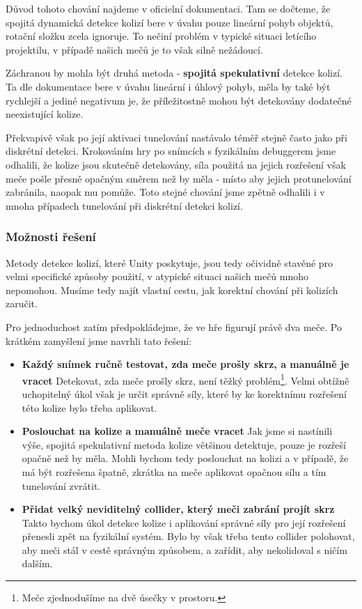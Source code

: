 Důvod tohoto chování najdeme v oficielní dokumentaci. Tam se dočteme, že spojitá dynamická detekce kolizí bere v úvahu pouze lineární pohyb objektů, rotační složku zcela ignoruje. To nečiní problém v typické situaci letícího projektilu, v případě našich mečů je to však silně nežádoucí.  

\bigbreak

Záchranou by mohla být druhá metoda - \textbf{spojitá spekulativní} detekce kolizí. Ta dle dokumentace bere v úvahu lineární i úhlový pohyb, měla by také být rychlejší a jediné negativum je, že příležitostně mohou být detekovány dodatečné neexistující kolize. 

Překvapivě však po její aktivaci tunelování nastávalo téměř stejně často jako při diskrétní detekci. Krokováním hry po snímcích s fyzikálním debuggerem jsme odhalili, že kolize jsou skutečně detekovány, síla použitá na jejich rozřešení však meče pošle přesně opačným směrem než by měla - místo aby jejich protunelování zabránila, naopak mu pomůže. Toto stejné chování jsme zpětně odhalili i v mnoha případech tunelování při diskrétní detekci kolizí.


\subsubsection*{Možnosti řešení}

Metody detekce kolizí, které Unity poskytuje, jsou tedy očividně stavěné pro velmi specifické způsoby použití, v atypické situaci našich mečů mnoho nepomohou. Musíme tedy najít vlastní cestu, jak korektní chování při kolizích zaručit. 

Pro jednoduchost zatím předpokládejme, že ve hře figurují právě dva meče. Po krátkém zamyšlení jsme navrhli tato řešení:
\begin{itemize}
  \item \textbf{Každý snímek ručně testovat, zda meče prošly skrz, a manuálně je vracet}\linebreak
    Detekovat, zda meče prošly skrz, není těžký problém\footnote{Meče zjednodušíme na dvě úsečky v prostoru.}. Velmi obtížně uchopitelný úkol však je určit správně síly, které by ke korektnímu rozřešení této kolize bylo třeba aplikovat.
  \item \textbf{Poslouchat na kolize a manuálně meče vracet}\linebreak
    Jak jsme si nastínili výše, spojitá spekulativní metoda kolize většinou detektuje, pouze je rozřeší opačně než by měla. Mohli bychom tedy poslouchat na kolizi a v případě, že má být rozřešena špatně, zkrátka na meče aplikovat opačnou sílu a tím tunelování zvrátit.
  \item \textbf{Přidat velký neviditelný collider, který meči zabrání projít skrz}\linebreak 
    Takto bychom úkol detekce kolize i aplikování správné síly pro její rozřešení přenesli zpět na fyzikální systém. Bylo by však třeba tento collider polohovat, aby meči stál v cestě správným způsobem, a zařídit, aby nekolidoval s ničím dalším.  
\end{itemize}

